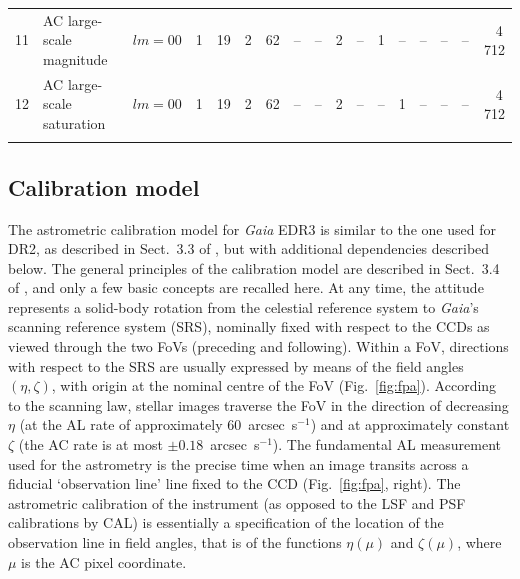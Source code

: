 \documentclass[longauth]{aa} %
\begin{document}
\begin{table}[t]
\begin{tabular}{rllcccccccccccccr}
11& AC large-scale magnitude & $lm=00$ & 1 & 19 & 2 & 62 & -- & -- & 2 & -- & 1 & -- & -- & -- & -- & 4\,712 \\ 
12& AC large-scale saturation & $lm=00$ & 1 & 19 & 2 & 62 & -- & -- & 2 & -- & -- & 1 & -- & -- & -- & 4\,712 \\ 
\noalign{\smallskip}
\hline
\end{tabular}
\end{table}

\subsection{Calibration model}
\label{sec:cal}

The astrometric calibration model for \textit{Gaia} EDR3 is similar to the one
used for DR2, as described in Sect.~3.3 of , but
with additional dependencies described below. 
The general principles of the calibration model are described in Sect.~3.4 of 
, and only a few basic concepts are recalled here.
At any time, the attitude represents a solid-body rotation from the celestial reference
system to \textit{Gaia}'s scanning reference system (SRS), nominally fixed with respect
to the CCDs as viewed through the two FoVs (preceding and following).
Within a FoV, directions with respect to the SRS are usually expressed by means of the
field angles $(\eta,\zeta)$, with origin at the nominal centre of the FoV (Fig.~\ref{fig:fpa}). 
According to the scanning law, stellar images traverse the FoV in the direction of decreasing 
$\eta$ (at the AL rate of approximately 60~arcsec~s$^{-1}$) and at approximately constant 
$\zeta$ (the AC rate is at most $\pm 0.18$~arcsec~s$^{-1}$). The fundamental AL measurement 
used for the astrometry is the precise time when an image transits across a fiducial 
`observation line' line fixed to the CCD (Fig.~\ref{fig:fpa}, right). The astrometric calibration 
of the instrument (as opposed to the LSF and PSF calibrations by CAL) is essentially a specification 
of the location of the observation line in field angles, that is of the functions $\eta(\mu)$ and 
$\zeta(\mu)$, where $\mu$ is the AC pixel coordinate.  
\end{document}
